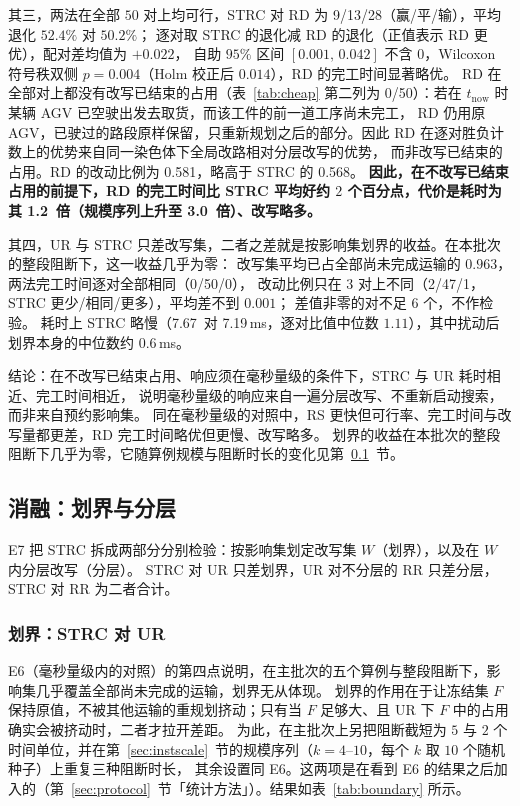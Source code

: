 \documentclass[manuscript,screen,review]{acmart}
\providecommand{\STRC}{\textsc{STRC}}
\newcommand{\NSeeds}{10}
\newcommand{\NPairs}{50}
\newcommand{\MsAllFuture}{7.19}      %
\newcommand{\MsCheapRtwo}{7.67}      %
\newcommand{\RedecodeRatio}{1.2}     %
\newcommand{\RedecodeBad}{0/\NPairs}
\newcommand{\WinVsRedecode}{9/13/28}  %
\newcommand{\WinVsAllFuture}{0/\NPairs/0}  %
\newcommand{\ResFracCheapRtwo}{0.568}
\newcommand{\ResFracRedecode}{0.581}
\newcommand{\RAStabWTL}{2/47/1}      %
\newcommand{\ScaleRatioHi}{3.0}  %
\begin{document}
其三，两法在全部 \(\NPairs\) 对上均可行，\STRC{} 对 RD 为 \WinVsRedecode（赢/平/输），平均退化 \(52.4\%\) 对 \(50.2\%\)；
逐对取 \STRC{} 的退化减 RD 的退化（正值表示 RD 更优），配对差均值为 \(+0.022\)，
自助 \(95\%\) 区间 \([0.001,\,0.042]\) 不含 \(0\)，Wilcoxon 符号秩双侧 \(p=0.004\)（Holm 校正后 \(0.014\)），RD 的完工时间显著略优。
RD 在全部对上都没有改写已结束的占用（表~\ref{tab:cheap} 第二列为 \RedecodeBad）：若在 \(t_{\mathrm{now}}\) 时某辆 AGV 已空驶出发去取货，而该工件的前一道工序尚未完工，
RD 仍用原 AGV，已驶过的路段原样保留，只重新规划之后的部分。因此 RD 在逐对胜负计数上的优势来自同一染色体下全局改路相对分层改写的优势，
而非改写已结束的占用。RD 的改动比例为 \ResFracRedecode，略高于 \STRC{} 的 \ResFracCheapRtwo。
\textbf{因此，在不改写已结束占用的前提下，RD 的完工时间比 \STRC{} 平均好约 \(2\) 个百分点，代价是耗时为其 \RedecodeRatio\ 倍（规模序列上升至 \ScaleRatioHi\ 倍）、改写略多。}

其四，UR 与 \STRC{} 只差改写集，二者之差就是按影响集划界的收益。在本批次的整段阻断下，这一收益几乎为零：
改写集平均已占全部尚未完成运输的 \(0.963\)，两法完工时间逐对全部相同（\WinVsAllFuture），
改动比例只在 \(3\) 对上不同（\RAStabWTL，\STRC{} 更少/相同/更多），平均差不到 \(0.001\)；
差值非零的对不足 \(6\) 个，不作检验。
耗时上 \STRC{} 略慢（\MsCheapRtwo\ 对 \MsAllFuture\,ms，逐对比值中位数 \(1.11\)），其中扰动后划界本身的中位数约 \(0.6\)\,ms。

结论：在不改写已结束占用、响应须在毫秒量级的条件下，\STRC{} 与 UR 耗时相近、完工时间相近，
说明毫秒量级的响应来自一遍分层改写、不重新启动搜索，而非来自预约影响集。
同在毫秒量级的对照中，RS 更快但可行率、完工时间与改写量都更差，RD 完工时间略优但更慢、改写略多。
划界的收益在本批次的整段阻断下几乎为零，它随算例规模与阻断时长的变化见第~\ref{sec:ablation}~节。

\subsection{消融：划界与分层}
\label{sec:ablation}

E7 把 \STRC{} 拆成两部分分别检验：按影响集划定改写集 \(W\)（划界），以及在 \(W\) 内分层改写（分层）。
\STRC{} 对 UR 只差划界，UR 对不分层的 RR 只差分层，\STRC{} 对 RR 为二者合计。

\subsubsection{划界：\STRC{} 对 UR}
\label{sec:boundary}

E6（毫秒量级内的对照）的第四点说明，在主批次的五个算例与整段阻断下，影响集几乎覆盖全部尚未完成的运输，划界无从体现。
划界的作用在于让冻结集 \(F\) 保持原值，不被其他运输的重规划挤动；只有当 \(F\) 足够大、且 UR 下 \(F\) 中的占用确实会被挤动时，二者才拉开差距。
为此，在主批次上另把阻断截短为 \(5\) 与 \(2\) 个时间单位，并在第~\ref{sec:instscale}~节的规模序列（\(k=4\)--\(10\)，每个 \(k\) 取 \(\NSeeds\) 个随机种子）上重复三种阻断时长，
其余设置同 E6。这两项是在看到 E6 的结果之后加入的（第~\ref{sec:protocol}~节「统计方法」）。结果如表~\ref{tab:boundary} 所示。
\end{document}
